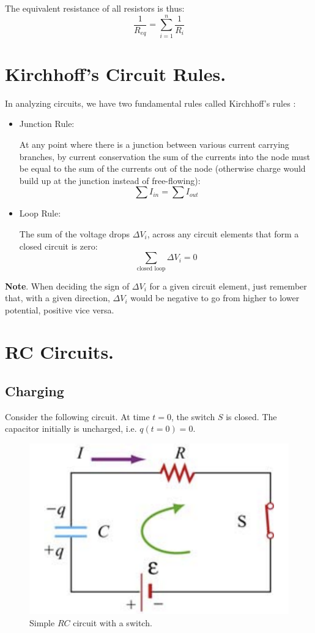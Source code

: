 \documentclass[11pt, letterpaper]{article}
\begin{document}
The equivalent resistance of all resistors is thus:
\begin{equation}\label{eqn:parallel}
	\boxed{\frac{1}{R_{eq}} = \sum_{i = 1}^{n} \frac{1}{R_i}}
\end{equation}

\section{Kirchhoff's Circuit Rules.}
In analyzing circuits, we have two fundamental rules called Kirchhoff's rules :
\begin{itemize}
	\item Junction Rule: 
	
	At any point where there is a junction between various current carrying branches, by current conservation the sum of the currents into the node must be equal to the sum of the currents out of the node (otherwise charge would build up at the junction instead of free-flowing): \[\sum I_{in} = \sum I_{out}\]
	\item Loop Rule:
	
	The sum of the voltage drops $\Delta V_i$, across any circuit elements that form a closed circuit is zero: \[\sum_{\text{closed loop}}\Delta V_i = 0\]
\end{itemize}

\textbf{Note}. When deciding the sign of $\Delta V_i$ for a given circuit element, just remember that, with a given direction, $\Delta V_i$ would be negative to go from higher to lower potential, positive vice versa.

\section{RC Circuits.}
\subsection{Charging}
Consider the following circuit. At time $t = 0$, the switch $S$ is closed. The capacitor initially is uncharged, i.e. $q(t = 0) = 0$. 
\begin{figure}[h!]
	\centering
	\includegraphics[scale=0.5]{rc}
	\caption{Simple $RC$ circuit with a switch.}
	\label{fig:rc}
\end{figure}
\end{document}
